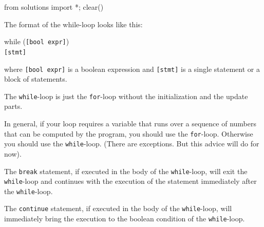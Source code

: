 \begin{python0}
from solutions import *; clear()
\end{python0}

The format of the while-loop looks like this:
\begin{center}
while (\texttt{[bool expr]})\\
\texttt{[stmt]}
\end{center}
where \texttt{[bool expr]} is a boolean expression and \texttt{[stmt]} is a single statement or a block of statements.

The \texttt{while}-loop is just the \texttt{for}-loop without the
initialization and the update parts.

In general, if your loop requires a variable that runs over a sequence
of numbers that can be computed by the program, you should use the
\texttt{for}-loop. Otherwise you should use the \texttt{while}-loop. (There
are exceptions. But this advice will do for now).

The \texttt{break} statement, if executed in the body of the
\texttt{while}-loop, will exit the \texttt{while}-loop and continues with
the execution of the statement immediately after the \texttt{while}-loop.

The \texttt{continue} statement, if executed in the body of the
\texttt{while}-loop, will immediately bring the execution to the boolean
condition of the \texttt{while}-loop.


